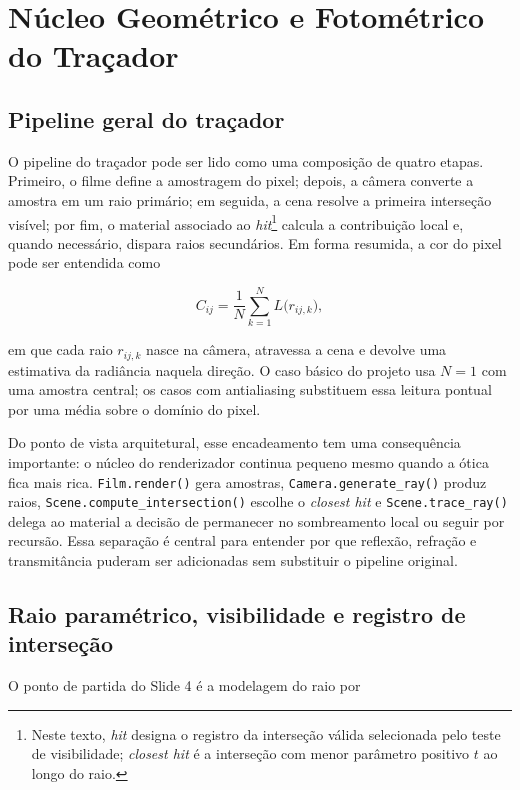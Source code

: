 \documentclass[portuguese]{sbcreviews-2025}%
\begin{document}
\section{Núcleo Geométrico e Fotométrico do Traçador}
\label{sec:nucleo-v3}

\subsection{Pipeline geral do traçador}
\label{sec:pipeline-v3}

O pipeline do traçador pode ser lido como uma composição de quatro etapas. Primeiro, o filme define a amostragem do pixel; depois, a câmera converte a amostra em um raio primário; em seguida, a cena resolve a primeira interseção visível; por fim, o material associado ao \emph{hit}\footnote{Neste texto, \emph{hit} designa o registro da interseção válida selecionada pelo teste de visibilidade; \emph{closest hit} é a interseção com menor parâmetro positivo \(t\) ao longo do raio.} calcula a contribuição local e, quando necessário, dispara raios secundários. Em forma resumida, a cor do pixel pode ser entendida como

\[
C_{ij} = \frac{1}{N}\sum_{k=1}^{N} L\bigl(r_{ij,k}\bigr),
\]

em que cada raio \(r_{ij,k}\) nasce na câmera, atravessa a cena e devolve uma estimativa da radiância naquela direção. O caso básico do projeto usa \(N=1\) com uma amostra central; os casos com antialiasing substituem essa leitura pontual por uma média sobre o domínio do pixel.

Do ponto de vista arquitetural, esse encadeamento tem uma consequência importante: o núcleo do renderizador continua pequeno mesmo quando a ótica fica mais rica. \texttt{Film.render()} gera amostras, \texttt{Camera.generate\_ray()} produz raios, \texttt{Scene.compute\_intersection()} escolhe o \emph{closest hit} e \texttt{Scene.trace\_ray()} delega ao material a decisão de permanecer no sombreamento local ou seguir por recursão. Essa separação é central para entender por que reflexão, refração e transmitância puderam ser adicionadas sem substituir o pipeline original.

\subsection{Raio paramétrico, visibilidade e registro de interseção}
\label{sec:raio-v3}

O ponto de partida do Slide 4 é a modelagem do raio por
\end{document}
